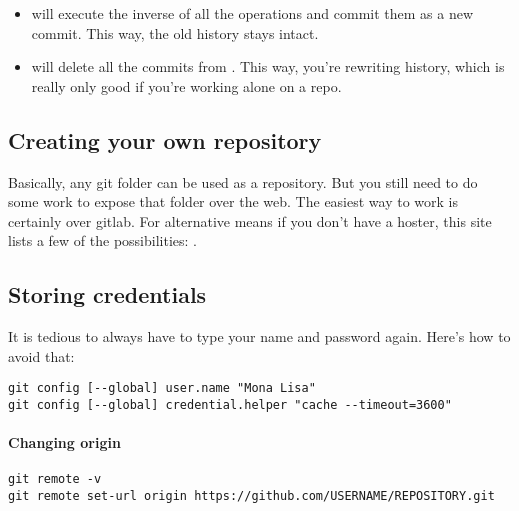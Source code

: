 \begin{itemize}
    \item {} will execute the inverse of all the operations and commit them as a new commit. This way, the old history stays intact.
    \item {} will delete all the commits from . This way, you're rewriting history, which is really only good if you're working alone on a repo.
\end{itemize}



\subsection{Creating your own repository}
Basically, any git folder can be used as a repository. But you still need to do some work to expose that folder over the web. The easiest way to work is certainly over gitlab. For alternative means if you don't have a hoster, this site lists a few of the possibilities: .



\subsection{Storing credentials}
It is tedious to always have to type your name and password again. Here's how to avoid that: 
\begin{lstlisting}
git config [--global] user.name "Mona Lisa"
git config [--global] credential.helper "cache --timeout=3600"
\end{lstlisting}

\paragraph{Changing origin}
\begin{lstlisting}
git remote -v
git remote set-url origin https://github.com/USERNAME/REPOSITORY.git
\end{lstlisting}
